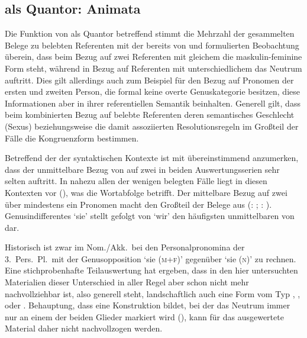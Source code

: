 \subsection{ als Quantor: Animata}

Die Funktion von  als Quantor betreffend stimmt die Mehrzahl der
gesammelten Belege zu belebten Referenten mit der bereits von
\citet[312]{grimm1890} und \citet[39--41]{behaghel1928} formulierten
Beobachtung überein, dass beim Bezug auf zwei Referenten mit gleichem
 die maskulin-feminine Form steht, während in Bezug auf Referenten
mit unterschiedlichem  das Neutrum auftritt. Dies gilt allerdings
auch zum Beispiel für den Bezug auf Pronomen der ersten und zweiten Person, die
formal keine overte Genuskategorie besitzen, diese
Informationen aber in ihrer referentiellen Semantik beinhalten. Generell gilt,
dass beim kombinierten Bezug auf belebte Referenten deren semantisches
Geschlecht (Sexus) beziehungsweise die damit assoziierten Resolutionsregeln im
Großteil der Fälle die Kongruenzform bestimmen.

Betreffend der  der syntaktischen Kontexte ist
mit \citet[624, Abbildung P~179]{ksw2} übereinstimmend anzumerken, dass der
unmittelbare Bezug von  auf zwei  in beiden
Auswertungsserien sehr selten auftritt. In nahezu allen der wenigen belegten
Fälle liegt in diesen Kontexten  vor
(), was die
Wortabfolge betrifft. Der mittelbare Bezug auf zwei
 über mindestens ein Pronomen macht den Großteil der Belege aus
(: ;
: ).
Genus\-indifferentes  `sie' stellt gefolgt von
 `wir' den häufigsten unmittelbaren  von 
dar.

Historisch ist zwar im Nom./Akk.\ bei den
Personalpronomina der 3.~Pers.\ Pl.\ mit der
Genus\-opposition  `sie (\textsc{m+f})' gegenüber  `sie
(\textsc{n})' zu rechnen. Eine stichprobenhafte Teilauswertung
hat ergeben, dass in den hier untersuchten Materialien dieser Unterschied in
aller Regel aber schon nicht mehr nachvollziehbar ist, also generell 
steht, landschaftlich auch eine Form vom Typ
,
,
 oder
\autocites[vgl.][213--214]{paul2007}[369, 390--397]{ksw2}[482--483]{wmu1}.
 Behauptung, dass  eine
Konstruktion bildet, bei der das Neutrum immer nur an einem der beiden Glieder
markiert wird (), kann für das ausgewertete Material daher
nicht nachvollzogen werden.

